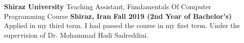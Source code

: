 \begin{cventries}
    \cventry
    {\textbf{Shiraz University}} %
    {Teaching Assistant, Fundamentals Of Computer Programming Course} %
    {\textbf{Shiraz, Iran}} %
    {\textbf{Fall 2019 (2nd Year of Bachelor’s)}} %
    {
        Applied in my third term. I had passed the course in my first term. Under the supervision of Dr. Mohammad Hadi Sadreddini.
    }

\end{cventries}
